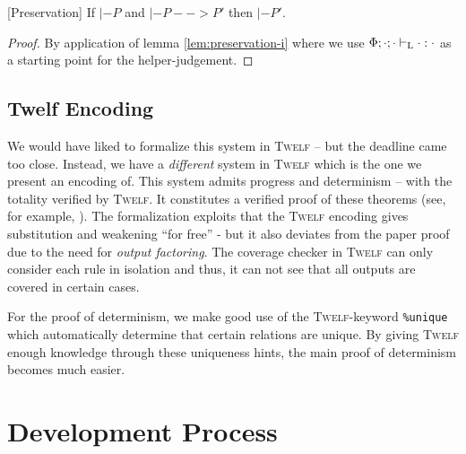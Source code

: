 \documentclass[a4paper, oneside, 10pt, final]{memoir}
\newcommand{\twelf}{\textsc{Twelf}}
\begin{document}
\begin{thm}{[Preservation]}
  \label{thm:preservation}
  If $|- P$ and $|- P --> P'$ then $|- P'$.
\end{thm}
\begin{proof}
  By application of lemma \ref{lem:preservation-i} where we use
  $\Phi;\cdot;\cdot |-_{\mathrm{L}} \cdot : \cdot$ as a starting point for the
  helper-judgement.
\end{proof}

\section{Twelf Encoding}

We would have liked to formalize this system in \twelf{} -- but the
deadline came too close. Instead, we have a \emph{different} system in
\twelf{} which is the one we present an encoding of. This system
admits progress and determinism -- with the totality verified by
\twelf{}. It constitutes a verified proof of these theorems (see, for
example, \cite{harper.crary:2005:how}). The formalization exploits
that the \twelf{} encoding gives substitution and weakening ``for
free'' - but it also deviates from the paper proof due to the need for
\emph{output factoring}. The coverage checker in \twelf{} can only
consider each rule in isolation and thus, it can not see that all
outputs are covered in certain cases.

For the proof of determinism, we make good use of the \twelf{}-keyword
\texttt{\%{}unique} which automatically determine that certain
relations are unique. By giving \twelf{} enough knowledge through
these uniqueness hints, the main proof of determinism becomes much
easier.

\chapter{Development Process}
\end{document}
